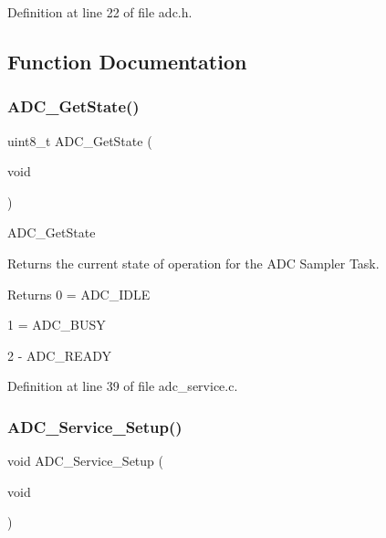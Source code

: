 Definition at line 22 of file adc.\+h.



\subsection{Function Documentation}
\mbox{\label{group___a_d_c_sampler_gaa2709405ead8733f44a8710753c55ca7}} 
\subsubsection{\texorpdfstring{A\+D\+C\+\_\+\+Get\+State()}{ADC\_GetState()}}
{\footnotesize\ttfamily uint8\+\_\+t A\+D\+C\+\_\+\+Get\+State (\begin{DoxyParamCaption}\item[{void}]{ }\end{DoxyParamCaption})}

A\+D\+C\+\_\+\+Get\+State

Returns the current state of operation for the A\+DC Sampler Task. \begin{DoxyReturn}{Returns}
0 = A\+D\+C\+\_\+\+I\+D\+LE 

1 = A\+D\+C\+\_\+\+B\+U\+SY 

2 -\/ A\+D\+C\+\_\+\+R\+E\+A\+DY 
\end{DoxyReturn}


Definition at line 39 of file adc\+\_\+service.\+c.

\mbox{\label{group___a_d_c_sampler_gacdda0c0aba15f6b2d6275cc2afdc5a05}} 
\subsubsection{\texorpdfstring{A\+D\+C\+\_\+\+Service\+\_\+\+Setup()}{ADC\_Service\_Setup()}}
{\footnotesize\ttfamily void A\+D\+C\+\_\+\+Service\+\_\+\+Setup (\begin{DoxyParamCaption}\item[{void}]{ }\end{DoxyParamCaption})}



